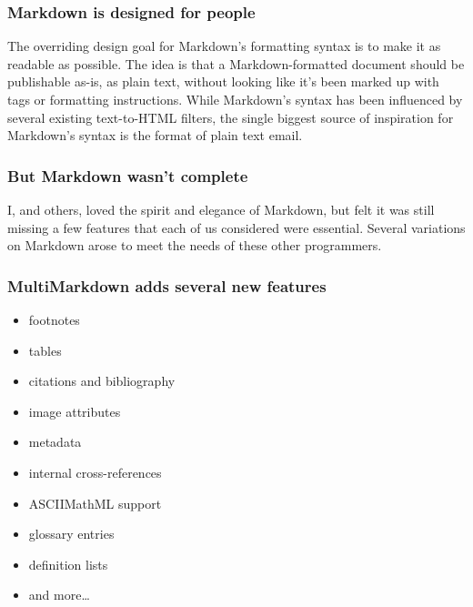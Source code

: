 \begin{frame}

\frametitle{Markdown is designed for people}
\label{markdownisdesignedforpeople}

The overriding design goal for Markdown's formatting syntax is to make it as
readable as possible. The idea is that a Markdown-formatted document should be
publishable as-is, as plain text, without looking like it's been marked up
with tags or formatting instructions. While Markdown's syntax has been
influenced by several existing text-to-HTML filters, the single biggest source
of inspiration for Markdown's syntax is the format of plain text email.
~\cite{Gruber}

\end{frame}

\begin{frame}

\frametitle{But Markdown wasn't complete}
\label{butmarkdownwasntcomplete}

I, and others, loved the spirit and elegance of Markdown, but felt it was
still missing a few features that each of us considered were essential.
Several variations on Markdown arose to meet the needs of these other
programmers.

\end{frame}

\begin{frame}

\frametitle{MultiMarkdown adds several new features}
\label{multimarkdownaddsseveralnewfeatures}

\begin{itemize}
\item footnotes

\item tables

\item citations and bibliography

\item image attributes

\item metadata

\item internal cross-references

\item ASCIIMathML support

\item glossary entries

\item definition lists

\item and more{\ldots}

\end{itemize}

\end{frame}

